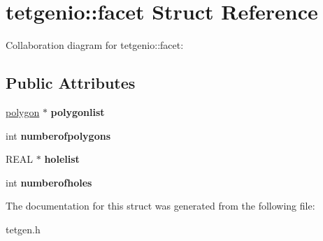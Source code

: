 \hypertarget{structtetgenio_1_1facet}{}\section{tetgenio\+:\+:facet Struct Reference}
\label{structtetgenio_1_1facet}


Collaboration diagram for tetgenio\+:\+:facet\+:
\subsection*{Public Attributes}
\begin{DoxyCompactItemize}
\item 
\mbox{\label{structtetgenio_1_1facet_ad73474fc4f07efdd714f0441948c5dfa}} 
\hyperlink{structtetgenio_1_1polygon}{polygon} $\ast$ {\bfseries polygonlist}
\item 
\mbox{\label{structtetgenio_1_1facet_a845d93a1341532b2f0de8b1e75a5d0bb}} 
int {\bfseries numberofpolygons}
\item 
\mbox{\label{structtetgenio_1_1facet_aecc34fbcd7087b45baecf2ba43d57757}} 
R\+E\+AL $\ast$ {\bfseries holelist}
\item 
\mbox{\label{structtetgenio_1_1facet_acc9857df4007aa20199f8979353339c7}} 
int {\bfseries numberofholes}
\end{DoxyCompactItemize}


The documentation for this struct was generated from the following file\+:\begin{DoxyCompactItemize}
\item 
tetgen.\+h\end{DoxyCompactItemize}
